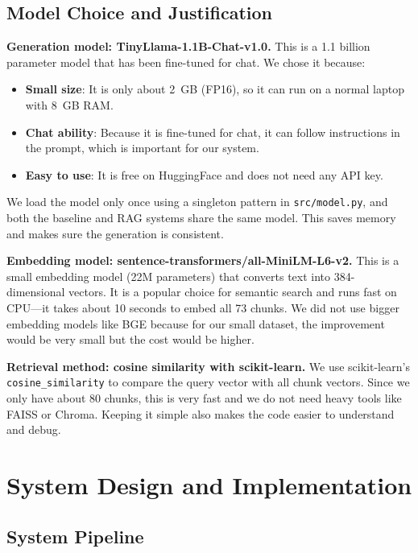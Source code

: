 \documentclass[10pt,conference]{IEEEtran}
\begin{document}
\subsection{Model Choice and Justification}

\textbf{Generation model: TinyLlama-1.1B-Chat-v1.0.} This is a 1.1 billion parameter model that has been fine-tuned for chat. We chose it because:
\begin{itemize}
    \item \textbf{Small size}: It is only about 2~GB (FP16), so it can run on a normal laptop with 8~GB RAM.
    \item \textbf{Chat ability}: Because it is fine-tuned for chat, it can follow instructions in the prompt, which is important for our system.
    \item \textbf{Easy to use}: It is free on HuggingFace and does not need any API key.
\end{itemize}

We load the model only once using a singleton pattern in \texttt{src/model.py}, and both the baseline and RAG systems share the same model. This saves memory and makes sure the generation is consistent.

\textbf{Embedding model: sentence-transformers/all-MiniLM-L6-v2.} This is a small embedding model (22M parameters) that converts text into 384-dimensional vectors. It is a popular choice for semantic search and runs fast on CPU---it takes about 10 seconds to embed all 73 chunks. We did not use bigger embedding models like BGE because for our small dataset, the improvement would be very small but the cost would be higher.

\textbf{Retrieval method: cosine similarity with scikit-learn.} We use scikit-learn's \texttt{cosine\_similarity} to compare the query vector with all chunk vectors. Since we only have about 80 chunks, this is very fast and we do not need heavy tools like FAISS or Chroma. Keeping it simple also makes the code easier to understand and debug.

\section{System Design and Implementation}
\label{sec:system}

\subsection{System Pipeline}
\end{document}
